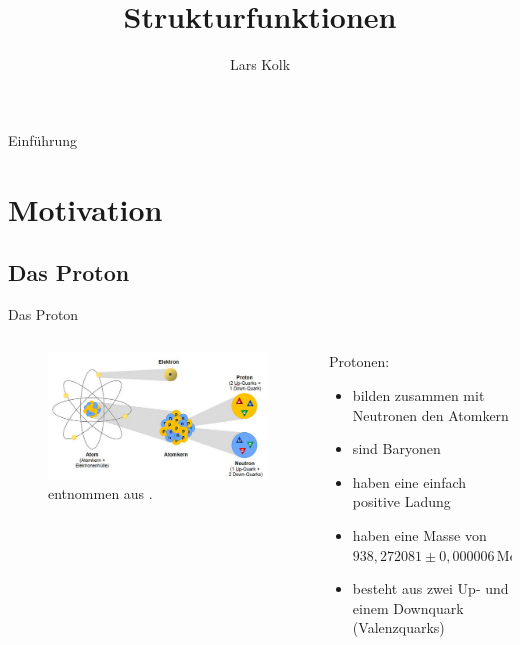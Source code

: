 \documentclass[aspectratio=1610, 9pt]{beamer}
\title{Strukturfunktionen}
\author[L.~Kolk]{Lars Kolk}
\institute[Fakultät Physik]{Fakultät Physik}
\begin{document}
\maketitle


\begin{frame}{Einführung}
  \tableofcontents
\end{frame}

\section{Motivation}
\subsection{Das Proton}
\begin{frame}{Das Proton}
\begin{columns}
\begin{column}{0.40\textwidth}
  \begin{figure}
      \includegraphics[width = \textwidth]{images/atom.png}
  \caption{entnommen aus \cite{leifi}.}
  \end{figure}

\end{column}
\begin{column}{0.60\textwidth}
    Protonen:
    \begin{itemize}
      \item{bilden zusammen mit Neutronen den Atomkern}
      \item{sind Baryonen}
      \item{haben eine einfach positive Ladung}
      \item{haben eine Masse von $938,272081 \pm 0,000006 \,\mathrm{MeV}$ }
      \item{besteht aus zwei Up- und einem Downquark (Valenzquarks)}
    \end{itemize}
\end{column}
\end{columns}
\end{frame}
\end{document}
